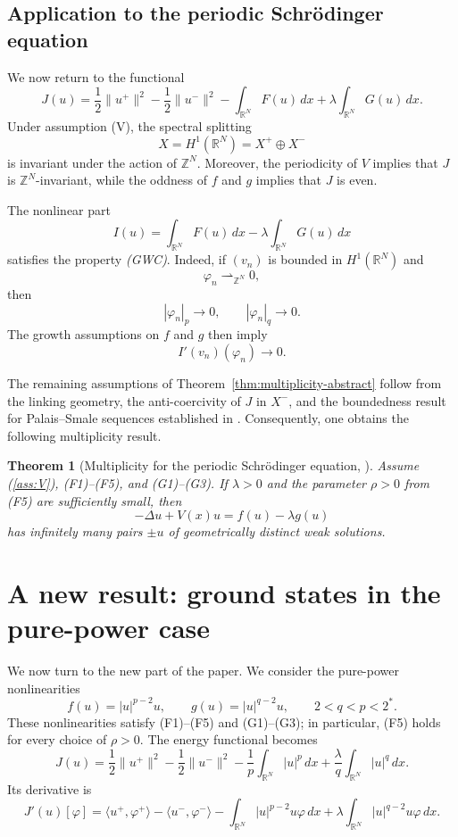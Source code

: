 \documentclass[10pt,a4paper]{amsart}
\numberwithin{equation}{section}
\newtheorem{theorem}{Theorem}[section]
\newcommand{\R}{\mathbb{R}}
\newcommand{\Z}{\mathbb{Z}}
\begin{document}
\subsection{Application to the periodic Schr\"odinger equation}

We now return to the functional
\[
J(u)
=
\frac12\|u^+\|^2
-
\frac12\|u^-\|^2
-
\int_{\R^N}F(u)\,dx
+
\lambda\int_{\R^N}G(u)\,dx.
\]
Under assumption \textup{(V)}, the spectral splitting
\[
X=H^1(\R^N)=X^+\oplus X^-
\]
is invariant under the action of $\Z^N$. Moreover, the periodicity of $V$
implies that $J$ is $\Z^N$-invariant, while the oddness of $f$ and $g$
implies that $J$ is even.

The nonlinear part
\[
I(u)
=
\int_{\R^N}F(u)\,dx
-
\lambda\int_{\R^N}G(u)\,dx
\]
satisfies the property \emph{(GWC)}. Indeed, if $(v_n)$ is bounded in
$H^1(\R^N)$ and
\[
\varphi_n\rightharpoonup_{\Z^N}0,
\]
then
\[
|\varphi_n|_p\to0,
\qquad
|\varphi_n|_q\to0.
\]
The growth assumptions on $f$ and $g$ then imply
\[
I'(v_n)(\varphi_n)\to0.
\]

The remaining assumptions of Theorem~\ref{thm:multiplicity-abstract} follow from the linking geometry, the
anti-coercivity of $J$ in $X^-$, and the
boundedness result for Palais--Smale sequences established in
\cite{BBS2025}. Consequently, one obtains the following multiplicity
result.

\begin{theorem}[Multiplicity for the periodic Schr\"odinger equation, {\cite[Theorem 4.7]{BBS2025}}]
Assume (\ref{ass:V}), (F1)--(F5), and (G1)--(G3). If
$\lambda>0$ and the parameter $\rho>0$ from (F5) are sufficiently
small, then
\[
-\Delta u+V(x)u=f(u)-\lambda g(u)
\]
has infinitely many pairs $\pm u$ of geometrically distinct weak
solutions.
\end{theorem}



\section{A new result: ground states in the pure-power case}

We now turn to the new part of the paper. We consider the pure-power
nonlinearities
\[
f(u)=|u|^{p-2}u,\qquad
g(u)=|u|^{q-2}u,
\qquad 2<q<p<2^*.
\]
These nonlinearities satisfy (F1)--(F5) and (G1)--(G3); in particular,
(F5) holds for every choice of $\rho>0$. The energy functional becomes
\begin{equation}\label{eq:J-power}
J(u)=\frac12\|u^+\|^2-\frac12\|u^-\|^2
-\frac1p\int_{\R^N}|u|^p\,dx
+\frac{\lambda}{q}\int_{\R^N}|u|^q\,dx.
\end{equation}
Its derivative is
\begin{equation}
J'(u)[\varphi]
=
\langle u^+,\varphi^+\rangle-\langle u^-,\varphi^-\rangle
-\int_{\R^N}|u|^{p-2}u\varphi\,dx
+\lambda\int_{\R^N}|u|^{q-2}u\varphi\,dx.
\end{equation}
\end{document}
